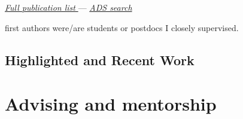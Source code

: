 \documentclass[12pt, letterpaper]{apw-cv}
\begin{document}
\href{https://adrian.pw/cv/PriceWhelan-pubs.pdf}{{\it Full publication list} \faLink}
--- \href{\adsurl}{{\it ADS search} \faLink}



{\color{deemph}\small {} first authors were/are students or postdocs I closely supervised.}

\subsection*{Highlighted and Recent Work}
    \begin{itemize}
        
    \end{itemize}


%         

%         


\section*{Advising and mentorship}

\end{document}
